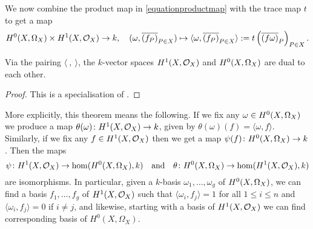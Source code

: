 We now combine the product map in \eqref{equationproductmap} with the trace map $t$ to get a map 
    \[
    {H^0(X,\Omega_X)} \times H^1(X,\mathcal{O}_X) \rightarrow k,\quad (\omega, \overline{(f_P)}_{P \in X}) \mapsto \langle \omega, \overline{(f_P)}_{P \in X} \rangle := t \left( \overline{(f \omega)}_P \right)_{P \in X}.
    \]

    \begin{thm}\label{theoremserreduality}
    Via the pairing $\langle\ ,\ \rangle$, the $k$-vector spaces $H^1(X,\mathcal{O}_X)$ and ${H^0(X,\Omega_X)}$ are dual to each other.
    \end{thm}
    \begin{proof}
    This is a specialisation of \cite[Chap.\ II, Thm.\ 2]{algebraicgroupsandclassfields}.
    \end{proof}

More explicitly, this theorem means the following.
If we fix any $\omega \in {H^0(X,\Omega_X)}$ we produce a map $\theta(\omega)\colon H^1(X,\mathcal{O}_X) \rightarrow k$, given by $\theta(\omega)(f) = \langle \omega , f\rangle$.
Similarly, if we fix any $f \in H^1(X,\mathcal{O}_X)$ then we get a map $\psi(f) \colon {H^0(X,\Omega_X)} \rightarrow k$.
Then the maps 
    \[
    \psi \colon H^1(X,\mathcal{O}_X) \rightarrow \hom(H^0(X,\Omega_X),k) \quad
    \text{and} \quad    
    \theta \colon H^0(X,\Omega_X) \rightarrow \hom(H^1(X,\mathcal{O}_X), k)
    \]
are isomorphisms.
In particular, given a $k$-basis $\omega_1, \ldots, \omega_g$ of ${H^0(X,\Omega_X)}$, we can find a basis $f_1, \ldots , f_g$ of $H^1(X,\mathcal{O}_X)$ such that $\langle \omega_i, f_j \rangle = 1$ for all $1 \leq i \leq n$ and $\langle \omega_i, f_j \rangle = 0$ if $i \neq j$, and likewise, starting with a basis of $H^1(X,\mathcal{O}_X)$ we can find corresponding basis of $H^0(X,\Omega_X)$. 





















